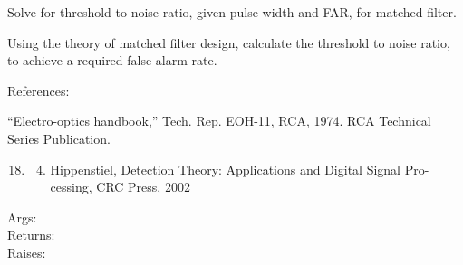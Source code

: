 \documentclass[a4paper,10pt,english]{sphinxmanual}
\begin{document}

\begin{fulllineitems}
\label{ryutils:pyradi.ryutils.detectThresholdToNoise}
Solve for threshold to noise ratio, given pulse width and FAR, for matched filter.

Using the theory of matched filter design, calculate the
threshold to noise ratio, to achieve a required false alarm rate.

References:

``Electro-optics handbook,'' Tech. Rep. EOH-11, RCA, 1974. RCA Technical Series Publication.
\begin{enumerate}
\setcounter{enumi}{17}
\item {} \begin{enumerate}
\setcounter{enumi}{3}
\item {} 
Hippenstiel, Detection Theory: Applications and Digital Signal Pro-cessing, CRC Press, 2002

\end{enumerate}

\end{enumerate}
\begin{description}
\item[{Args:}] \leavevmode
{}

\item[{Returns:}] \leavevmode
{}

\item[{Raises:}] \leavevmode
{}

\end{description}

\end{fulllineitems}
\end{document}
